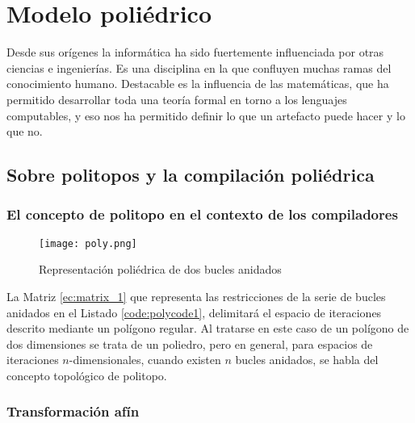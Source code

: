%
%
%
%

\cleardoublepage
\chapter{Modelo poliédrico} \label{chap:polytopes}  

Desde sus orígenes la informática ha sido fuertemente influenciada por otras ciencias e ingenierías. Es una disciplina en la que confluyen muchas ramas del conocimiento
humano. Destacable es la influencia de las matemáticas, que ha permitido desarrollar 
toda una teoría formal en torno a los lenguajes computables, y eso nos ha permitido definir lo que un artefacto puede hacer y lo que no.

\section{Sobre politopos y la compilación poliédrica}

\subsection{El concepto de politopo en el contexto de los compiladores}


\begin{figure}[h]
	\centering
	\texttt{[image: poly.png]}
	\caption{Representación poliédrica de dos bucles anidados}
	\label{fig:polytope_1}
\end{figure}

La Matriz \ref{ec:matrix_1} que representa las restricciones de la serie de bucles 
anidados en el Listado \ref{code:polycode1}, delimitará el espacio de iteraciones descrito 
mediante un polígono regular. 
Al tratarse en este caso de un polígono de dos dimensiones se trata de un poliedro, pero 
en general, para espacios de iteraciones $n$-dimensionales, cuando existen $n$ 
bucles anidados, se habla del concepto topológico de politopo.

\subsection{Transformación afín}

